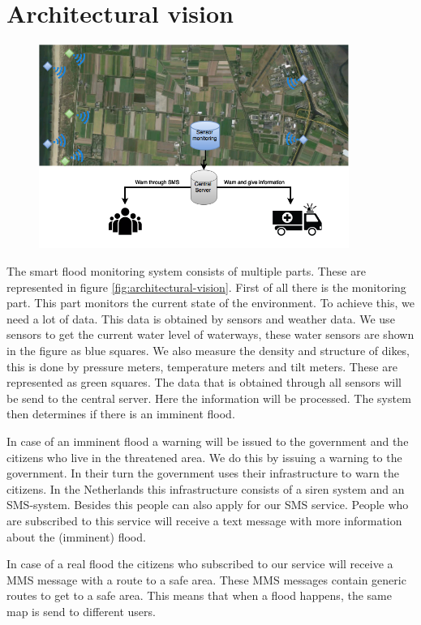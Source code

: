 \section{Architectural vision}
\begin{figure}[hb!]
\includegraphics[keepaspectratio=true,width=0.9\textwidth]{images/archVision.png}
\end{figure}

The smart flood monitoring system consists of multiple parts. These are represented in figure \ref{fig:architectural-vision}. First of all there is the monitoring part. This part monitors the current state of the environment. To achieve this, we need a lot of data. This data is obtained by sensors and weather data. We use sensors to get the current water level of waterways, these water sensors are shown in the figure as blue squares. We also measure the density and structure of dikes, this is done by pressure meters, temperature meters and tilt meters. These are represented as green squares. The data that is obtained through all sensors will be send to the central server. Here the information will be processed. The system then determines if there is an imminent flood.

In case of an imminent flood a warning will be issued to the government and the citizens who live in the threatened area. We do this by issuing a warning to the government. In their turn the government uses their infrastructure to warn the citizens. In the Netherlands this infrastructure consists of a siren system and an SMS-system. Besides this people can also apply for our SMS service. People who are subscribed to this service will receive a text message with more information about the (imminent) flood. 

In case of a real flood the citizens who subscribed to our service will receive a MMS message with a route to a safe area. These MMS messages contain generic routes to get to a safe area. This means that when a flood happens, the same map is send to different users.
